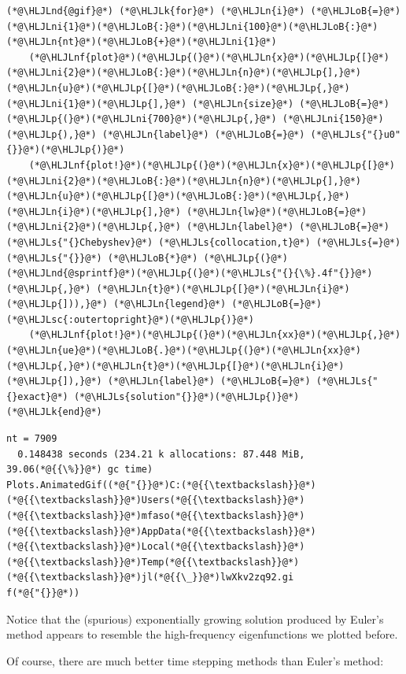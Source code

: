 \documentclass[12pt,a4paper]{article}
\newcommand{\HLJLk}[1]{\textcolor[RGB]{148,91,176}{\textbf{#1}}}
\newcommand{\HLJLn}[1]{#1}
\newcommand{\HLJLnd}[1]{\textcolor[RGB]{214,102,97}{#1}}
\newcommand{\HLJLnf}[1]{\textcolor[RGB]{66,102,213}{#1}}
\newcommand{\HLJLs}[1]{\textcolor[RGB]{201,61,57}{#1}}
\newcommand{\HLJLsc}[1]{\textcolor[RGB]{201,61,57}{#1}}
\newcommand{\HLJLni}[1]{\textcolor[RGB]{59,151,46}{#1}}
\newcommand{\HLJLoB}[1]{\textcolor[RGB]{102,102,102}{\textbf{#1}}}
\newcommand{\HLJLp}[1]{#1}
\begin{document}
\begin{lstlisting}
(*@\HLJLnd{@gif}@*) (*@\HLJLk{for}@*) (*@\HLJLn{i}@*) (*@\HLJLoB{=}@*) (*@\HLJLni{1}@*)(*@\HLJLoB{:}@*)(*@\HLJLni{100}@*)(*@\HLJLoB{:}@*)(*@\HLJLn{nt}@*)(*@\HLJLoB{+}@*)(*@\HLJLni{1}@*)
    (*@\HLJLnf{plot}@*)(*@\HLJLp{(}@*)(*@\HLJLn{x}@*)(*@\HLJLp{[}@*)(*@\HLJLni{2}@*)(*@\HLJLoB{:}@*)(*@\HLJLn{n}@*)(*@\HLJLp{],}@*) (*@\HLJLn{u}@*)(*@\HLJLp{[}@*)(*@\HLJLoB{:}@*)(*@\HLJLp{,}@*)(*@\HLJLni{1}@*)(*@\HLJLp{],}@*) (*@\HLJLn{size}@*) (*@\HLJLoB{=}@*) (*@\HLJLp{(}@*)(*@\HLJLni{700}@*)(*@\HLJLp{,}@*) (*@\HLJLni{150}@*)(*@\HLJLp{),}@*) (*@\HLJLn{label}@*) (*@\HLJLoB{=}@*) (*@\HLJLs{"{}u0"{}}@*)(*@\HLJLp{)}@*)
    (*@\HLJLnf{plot!}@*)(*@\HLJLp{(}@*)(*@\HLJLn{x}@*)(*@\HLJLp{[}@*)(*@\HLJLni{2}@*)(*@\HLJLoB{:}@*)(*@\HLJLn{n}@*)(*@\HLJLp{],}@*) (*@\HLJLn{u}@*)(*@\HLJLp{[}@*)(*@\HLJLoB{:}@*)(*@\HLJLp{,}@*)(*@\HLJLn{i}@*)(*@\HLJLp{],}@*) (*@\HLJLn{lw}@*)(*@\HLJLoB{=}@*)(*@\HLJLni{2}@*)(*@\HLJLp{,}@*) (*@\HLJLn{label}@*) (*@\HLJLoB{=}@*) (*@\HLJLs{"{}Chebyshev}@*) (*@\HLJLs{collocation,t}@*) (*@\HLJLs{=}@*) (*@\HLJLs{"{}}@*) (*@\HLJLoB{*}@*) (*@\HLJLp{(}@*)(*@\HLJLnd{@sprintf}@*)(*@\HLJLp{(}@*)(*@\HLJLs{"{}{\%}.4f"{}}@*)(*@\HLJLp{,}@*) (*@\HLJLn{t}@*)(*@\HLJLp{[}@*)(*@\HLJLn{i}@*)(*@\HLJLp{])),}@*) (*@\HLJLn{legend}@*) (*@\HLJLoB{=}@*) (*@\HLJLsc{:outertopright}@*)(*@\HLJLp{)}@*)
    (*@\HLJLnf{plot!}@*)(*@\HLJLp{(}@*)(*@\HLJLn{xx}@*)(*@\HLJLp{,}@*) (*@\HLJLn{ue}@*)(*@\HLJLoB{.}@*)(*@\HLJLp{(}@*)(*@\HLJLn{xx}@*)(*@\HLJLp{,}@*)(*@\HLJLn{t}@*)(*@\HLJLp{[}@*)(*@\HLJLn{i}@*)(*@\HLJLp{]),}@*) (*@\HLJLn{label}@*) (*@\HLJLoB{=}@*) (*@\HLJLs{"{}exact}@*) (*@\HLJLs{solution"{}}@*)(*@\HLJLp{)}@*)
(*@\HLJLk{end}@*)
\end{lstlisting}

\begin{lstlisting}
nt = 7909
  0.148438 seconds (234.21 k allocations: 87.448 MiB, 39.06(*@{{\%}}@*) gc time)
Plots.AnimatedGif((*@{"{}}@*)C:(*@{{\textbackslash}}@*)(*@{{\textbackslash}}@*)Users(*@{{\textbackslash}}@*)(*@{{\textbackslash}}@*)mfaso(*@{{\textbackslash}}@*)(*@{{\textbackslash}}@*)AppData(*@{{\textbackslash}}@*)(*@{{\textbackslash}}@*)Local(*@{{\textbackslash}}@*)(*@{{\textbackslash}}@*)Temp(*@{{\textbackslash}}@*)(*@{{\textbackslash}}@*)jl(*@{{\_}}@*)lwXkv2zq92.gi
f(*@{"{}}@*))
\end{lstlisting}


Notice that the (spurious) exponentially growing solution produced by Euler's method appears to resemble the high-frequency eigenfunctions we plotted before.

Of course, there are much better time stepping methods than Euler's method:
\end{document}
